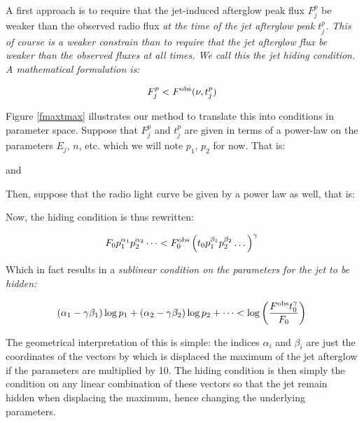 A first approach is to require that the jet-induced afterglow peak flux $F_j^p$ be weaker than the observed radio flux \it{at the time of the jet afterglow peak} $t_j^p$. This of course is a weaker constrain than to require that the jet afterglow flux be \it{weaker than the observed fluxes at all times}. We call this the \it{jet hiding} condition. A mathematical formulation is:

\begin{equation}F_j^p < F^{\rm{obs}}(\nu, t_j^p) \end{equation}

Figure \ref{fmaxtmax} illustrates our method to translate this into conditions in parameter space. Suppose that $F_j^p$ and $t_j^p$ are given in terms of a power-law on the parameters $E_j$, $n$, etc. which we will note $p_1$, $p_2$ for now. That is:


and


Then, suppose that the radio light curve be given by a power law as well, that is:

\cen{\Fobs(\nu, \tobs) = \Fobs_0 \tobs^{\gamma}}

Now, the hiding condition is thus rewritten:

\begin{equation}F_0 p_1^{\alpha_1} p_2^{\alpha_2} \dots < \Fobs_0 \left( t_0 p_1^{\beta_1} p_2^{\beta_2} \dots \right)^{\gamma} \end{equation}

Which in fact results in a \it{sublinear condition} on the parameters for the jet to be hidden:

\begin{equation}(\alpha_1 - \gamma \beta_1) \log p_1 + (\alpha_2 - \gamma \beta_2) \log p_2 + \dots < \log \left( \frac{\Fobs t_0 ^\gamma}{F_0} \right) \end{equation}

The geometrical interpretation of this is simple: the indices $\alpha_i$ and $\beta_i$ are just the coordinates of the vectors by which is displaced the maximum of the jet afterglow if the parameters are multiplied by 10. The hiding condition is then simply the condition on any linear combination of these vectors so that the jet remain hidden when displacing the maximum, hence changing the underlying parameters.



